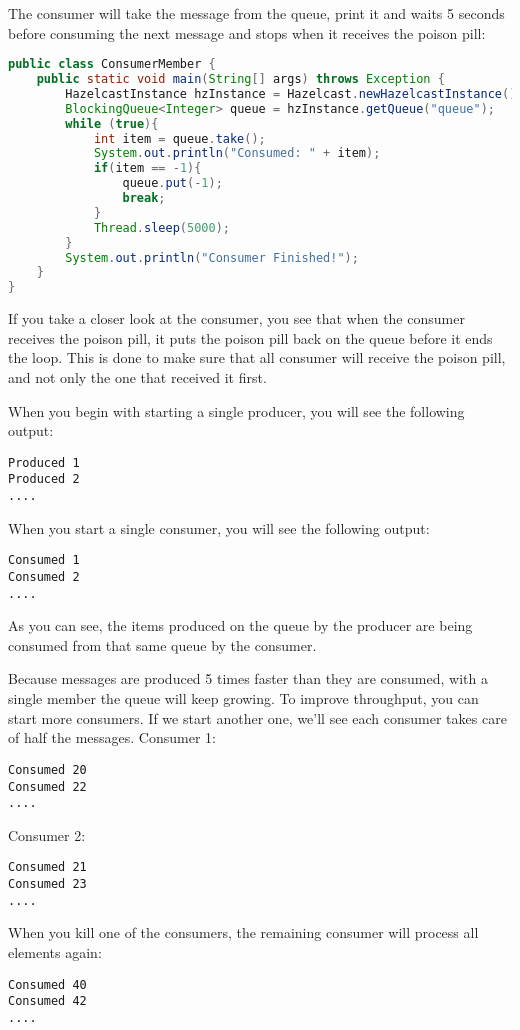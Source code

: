 The consumer will take the message from the queue, print it and waits 5 seconds before consuming the next message and stops when it receives the poison pill:
\begin{lstlisting}[language=java]
public class ConsumerMember {
    public static void main(String[] args) throws Exception {
        HazelcastInstance hzInstance = Hazelcast.newHazelcastInstance();
        BlockingQueue<Integer> queue = hzInstance.getQueue("queue");
        while (true){
            int item = queue.take();
            System.out.println("Consumed: " + item);
            if(item == -1){
                queue.put(-1);
                break;
            }     
            Thread.sleep(5000);            
        }
        System.out.println("Consumer Finished!");
    }
}
\end{lstlisting}
If you take a closer look at the consumer, you see that when the consumer receives the poison pill, it puts the poison pill back on the queue before it ends the loop. This is done to make sure that all consumer will receive the poison pill, and not only the one that received it first.

When you begin with starting a single producer, you will see the following output:
\begin{lstlisting}
Produced 1
Produced 2
....
\end{lstlisting}
When you start a single consumer, you will see the following output:
\begin{lstlisting}
Consumed 1
Consumed 2
....
\end{lstlisting}
As you can see, the items produced on the queue by the producer are being consumed from that same queue by the consumer. 

Because messages are produced 5 times faster than they are consumed, with a single member the queue will keep growing. To improve throughput, you can start more consumers. If we start another one, we'll see each consumer takes care of half the messages. Consumer 1:
\begin{lstlisting}
Consumed 20
Consumed 22
....
\end{lstlisting}
Consumer 2:
\begin{lstlisting}
Consumed 21
Consumed 23
....
\end{lstlisting}
When you kill one of the consumers, the remaining consumer will process all elements again:
\begin{lstlisting}
Consumed 40  
Consumed 42 
....
\end{lstlisting}

